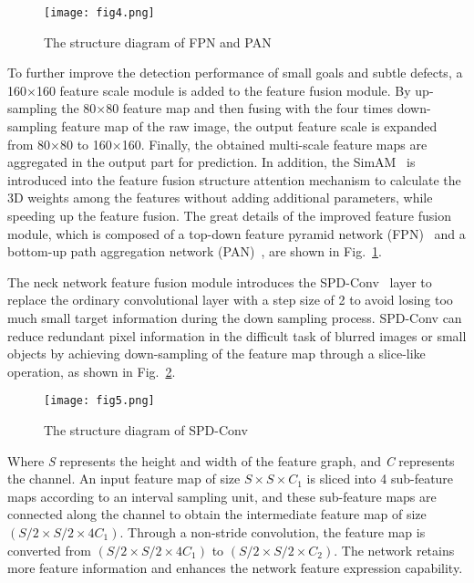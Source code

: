 \documentclass[sn-mathphys,Numbered]{sn-jnl}%
\theoremstyle{thmstyleone}%
\theoremstyle{thmstyletwo}%
\theoremstyle{thmstylethree}%
\begin{document}
\begin{figure}[h]%
\centering
\texttt{[image: fig4.png]}
\caption{The structure diagram of FPN and PAN}\label{fig4}
\end{figure}

To further improve the detection performance of small goals and subtle defects, a 160×160 feature scale module is added to the feature fusion module. By up-sampling the 80×80 feature map and then fusing with the four times down-sampling feature map of the raw image, the output feature scale is expanded from 80×80 to 160×160. Finally, the obtained multi-scale feature maps are aggregated in the output part for prediction. In addition, the SimAM~\cite{yang2021simam} is introduced into the feature fusion structure attention mechanism to calculate the 3D weights among the features without adding additional parameters, while speeding up the feature fusion. The great details of the improved feature fusion module, which is composed of a top-down feature pyramid network (FPN)~\cite{lin2017feature} and a bottom-up path aggregation network (PAN)~\cite{li2018pyramid}, are shown in Fig.~\ref{fig4}.

The neck network feature fusion module introduces the SPD-Conv~\cite{sunkara2022no} layer to replace the ordinary convolutional layer with a step size of 2 to avoid losing too much small target information during the down sampling process. SPD-Conv can reduce redundant pixel information in the difficult task of blurred images or small objects by achieving down-sampling of the feature map through a slice-like operation, as shown in Fig.~\ref{fig5}.

\begin{figure}[h]%
\centering
\texttt{[image: fig5.png]}
\caption{The structure diagram of SPD-Conv}\label{fig5}
\end{figure}

Where \emph{S} represents the height and width of the feature graph, and \emph{C} represents the channel. An input feature map of size $S \times S \times {C_1}$ is sliced into 4 sub-feature maps according to an interval sampling unit, and these sub-feature maps are connected along the channel to obtain the intermediate feature map of size $\left( {S/2 \times S/2 \times 4{C_1}} \right)$. Through a non-stride convolution, the feature map is converted from $\left( {S/2 \times S/2 \times 4{C_1}} \right)$ to $\left( {S/2 \times S/2 \times {C_2}} \right)$. The network retains more feature information and enhances the network feature expression capability.
\end{document}
